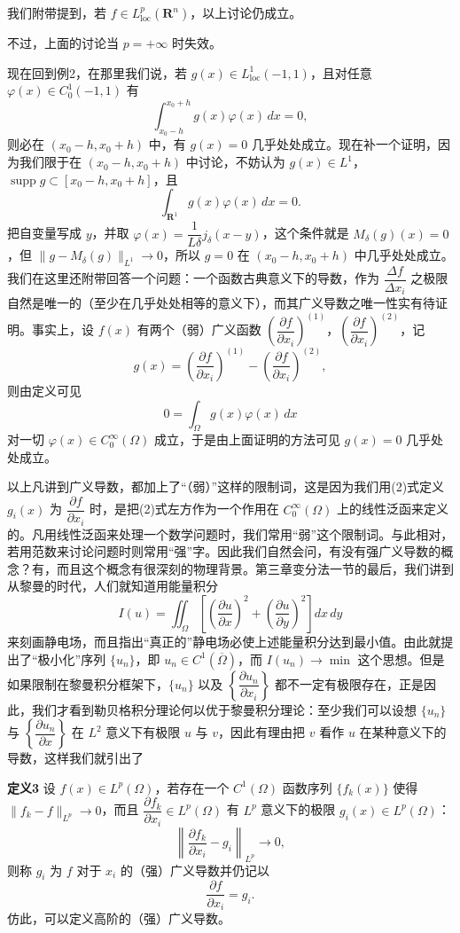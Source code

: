 我们附带提到，若 $f\in L^p_{\mathrm{loc}}(\mathbf R^n)$，以上讨论仍成立。

不过，上面的讨论当 $p=+\infty$ 时失效。

现在回到例2，在那里我们说，若 $g(x)\in L^1_{\mathrm{loc}}(-1,1)$，且对任意\linebreak[1] $\varphi(x)\in C_0^1(-1,1)$ 有
\[
 \int_{x_0-h}^{x_0+h}g(x)\varphi(x)\,dx=0,
\]
则必在 $(x_0-h,x_0+h)$ 中，有 $g(x)=0$ 几乎处处成立。现在补一个证明，因为我们限于在 $(x_0-h,x_0+h)$ 中讨论，不妨认为 $g(x)\in L^1$，$\operatorname{supp}g\subset[x_0-h,x_0+h]$，且
\[
 \int_{\mathbf R^1}g(x)\varphi(x)\,dx=0.
\]
把自变量写成 $y$，并取 $\varphi(x)=\dfrac1{L\delta}j_\delta(x-y)$，这个条件就是 $M_\delta(g)(x)=0$，但 $\|g-M_\delta(g)\|_{L^1}\to0$，所以 $g=0$ 在 $(x_0-h,x_0+h)$ 中几乎处处成立。我们在这里还附带回答一个问题：一个函数古典意义下的导数，作为 $\dfrac{\Delta f}{\Delta x_i}$ 之极限自然是唯一的（至少在几乎处处相等的意义下），而其广义导数之唯一性实有待证明。事实上，设 $f(x)$ 有两个（弱）广义函数 $\left(\dfrac{\partial f}{\partial x_i}\right)^{(1)}$，$\left(\dfrac{\partial f}{\partial x_i}\right)^{(2)}$，记
\[
 g(x)=\left(\frac{\partial f}{\partial x_i}\right)^{(1)}-
 \left(\frac{\partial f}{\partial x_i}\right)^{(2)},
\]
则由定义可见
\[
 0=\int_\Omega g(x)\varphi(x)\,dx
\]
对一切 $\varphi(x)\in C_0^\infty(\Omega)$ 成立，于是由上面证明的方法可见 $g(x)=0$ 几乎处处成立。

以上凡讲到广义导数，都加上了“（弱）”这样的限制词，这是因为我们用(2)式定义 $g_i(x)$ 为 $\dfrac{\partial f}{\partial x_i}$ 时，是把(2)式左方作为一个作用在 $C_0^\infty(\Omega)$ 上的线性泛函来定义的。凡用线性泛函来处理一个数学问题时，我们常用“弱”这个限制词。与此相对，若用范数来讨论问题时则常用“强”字。因此我们自然会问，有没有强广义导数的概念？有，而且这个概念有很深刻的物理背景。第三章变分法一节的最后，我们讲到从黎曼的时代，人们就知道用能量积分
\[
 I(u)=\iint_\Omega\left[\left(\frac{\partial u}{\partial x}\right)^2+
 \left(\frac{\partial u}{\partial y}\right)^2\right]dx\,dy
\]
来刻画静电场，而且指出“真正的”静电场必使上述能量积分达到最小值。由此就提出了“极小化”序列 $\{u_n\}$，即 $u_n\in C^1(\overline\Omega)$，而 $I(u_n)\to\min$ 这个思想。但是如果限制在黎曼积分框架下，$\{u_n\}$ 以及 $\left\{\dfrac{\partial u_n}{\partial x_i}\right\}$ 都不一定有极限存在，正是因此，我们才看到勒贝格积分理论何以优于黎曼积分理论：至少我们可以设想 $\{u_n\}$ 与 $\left\{\dfrac{\partial u_n}{\partial x}\right\}$ 在 $L^2$ 意义下有极限 $u$ 与 $v$，因此有理由把 $v$ 看作 $u$ 在某种意义下的导数，这样我们就引出了

\noindent\textbf{定义3}
设 $f(x)\in L^p(\Omega)$，若存在一个 $C^1(\Omega)$ 函数序列 $\{f_k(x)\}$ 使得 $\|f_k-f\|_{L^p}\to0$，而且 $\dfrac{\partial f_k}{\partial x_i}\in L^p(\Omega)$ 有 $L^p$ 意义下的极限 $g_i(x)\in L^p(\Omega)$：
\[
 \left\|\frac{\partial f_k}{\partial x_i}-g_i\right\|_{L^p}\to0,
\]
则称 $g_i$ 为 $f$ 对于 $x_i$ 的（强）广义导数并仍记以
\[
 \frac{\partial f}{\partial x_i}=g_i.
\]
仿此，可以定义高阶的（强）广义导数。

